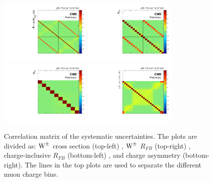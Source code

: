 \begin{figure}[!h]
 \begin{center}
  \includegraphics[width=0.40\textwidth]{Figures/WBoson/Analysis/CovarianceMatrix/PA/Cross_Section/covMatrix_WToMuPl_PA_Cross_Section_Total_Total.pdf}
  \includegraphics[width=0.40\textwidth]{Figures/WBoson/Analysis/CovarianceMatrix/PA/ForwardBackward_Ratio/covMatrix_WToMuPl_PA_ForwardBackward_Ratio_Total_Total.pdf}
  \includegraphics[width=0.40\textwidth]{Figures/WBoson/Analysis/CovarianceMatrix/PA/ForwardBackward_Ratio/covMatrix_WToMu_PA_ForwardBackward_Ratio_Total_Total.pdf}
  \includegraphics[width=0.40\textwidth]{Figures/WBoson/Analysis/CovarianceMatrix/PA/Charge_Asymmetry/covMatrix_WToMu_PA_Charge_Asymmetry_Total_Total.pdf}
 \end{center}
 \caption{Correlation matrix of the systematic uncertainties. The plots are divided as: $\text{W}^{\pm}$ cross section (top-left) , $\text{W}^{\pm}$ $R_{FB}$ (top-right) , charge-inclusive $R_{FB}$ (bottom-left) , and charge asymmetry (bottom-right). The lines in the top plots are used to separate the different muon charge bins.}
 \label{fig:CorrelationMatrix}
\end{figure}


